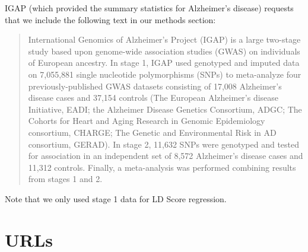 \documentclass[11pt]{article}
\numberwithin{equation}{section}
\begin{document}
IGAP (which provided the summary statistics for Alzheimer's disease) requests that we include the following text in our methods section:
\begin{quotation}
    International Genomics of Alzheimer's Project (IGAP) is a large two-stage study based upon genome-wide association studies (GWAS) on individuals of European ancestry. 
    In stage 1, IGAP used genotyped and imputed data on 7,055,881 single nucleotide polymorphisms (SNPs) to meta-analyze four previously-published GWAS datasets consisting of 17,008 Alzheimer's disease cases and 37,154 controls 
    (The European Alzheimer's disease Initiative, EADI; the Alzheimer Disease Genetics Consortium, ADGC; The Cohorts for Heart and Aging Research in Genomic Epidemiology consortium, CHARGE; The Genetic and Environmental Risk in AD consortium, GERAD). 
    In stage 2, 11,632 SNPs were genotyped and tested for association in an independent set of 8,572 Alzheimer's disease cases and 11,312 controls. 
    Finally, a meta-analysis was performed combining results from stages 1 and 2.
\end{quotation}
Note that we only used stage 1 data for LD Score regression.

\newpage
%


\section{URLs}\label{URLs}
\end{document}
